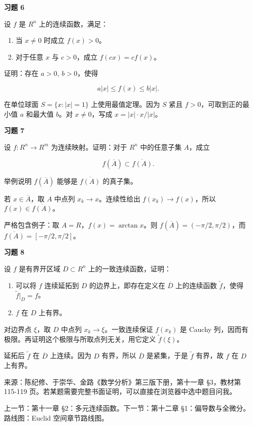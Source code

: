\begin{exercisebox}
\textbf{习题 6}

设 \(f\) 是 \(R^n\) 上的连续函数，满足：

\begin{enumerate}
 \item 当 \(x\ne0\) 时成立 \(f(x)>0\)。
 \item 对于任意 \(x\) 与 \(c>0\)，成立 \(f(cx)=cf(x)\)。
 \end{enumerate}

证明：存在 \(a>0,\ b>0\)，使得

\[
        a|x|\le f(x)\le b|x|.
      \]

\begin{hintbox}
在单位球面 \(S=\{x:|x|=1\}\) 上使用最值定理。因为 \(S\) 紧且 \(f>0\)，可取到正的最小值 \(a\) 和最大值 \(b\)。对 \(x\ne0\)，写成 \(x=|x|\cdot x/|x|\)。
\end{hintbox}
\end{exercisebox}

\begin{exercisebox}
\textbf{习题 7}

设 \(f:R^n\to R^m\) 为连续映射。证明：对于 \(R^n\) 中的任意子集 \(A\)，成立

\[
        f(\overline A)\subset \overline{f(A)}.
      \]

举例说明 \(f(\overline A)\) 能够是 \(\overline{f(A)}\) 的真子集。

\begin{hintbox}
若 \(x\in\overline A\)，取 \(A\) 中点列 \(x_k\to x\)。连续性给出 \(f(x_k)\to f(x)\)，所以 \(f(x)\in\overline{f(A)}\)。

严格包含例子：取 \(A=R\)，\(f(x)=\arctan x\)。则 \(f(\overline A)=(-\pi/2,\pi/2)\)，而 \(\overline{f(A)}=[-\pi/2,\pi/2]\)。
\end{hintbox}
\end{exercisebox}

\begin{exercisebox}
\textbf{习题 8}

设 \(f\) 是有界开区域 \(D\subset R^n\) 上的一致连续函数，证明：

\begin{enumerate}
 \item 可以将 \(f\) 连续延拓到 \(D\) 的边界上，即存在定义在 \(\overline D\) 上的连续函数 \(\widetilde f\)，使得 \(\widetilde f|_D=f\)。
 \item \(f\) 在 \(D\) 上有界。
 \end{enumerate}

\begin{hintbox}
对边界点 \(\xi\)，取 \(D\) 中点列 \(x_k\to\xi\)。一致连续保证 \(f(x_k)\) 是 Cauchy 列，因而有极限。再证明这个极限与所取点列无关，用它定义 \(\widetilde f(\xi)\)。

延拓后 \(\widetilde f\) 在 \(\overline D\) 上连续。因为 \(D\) 有界，所以 \(\overline D\) 是紧集，于是 \(\widetilde f\) 有界，故 \(f\) 在 \(D\) 上有界。
\end{hintbox}
\end{exercisebox}

来源：陈纪修、于崇华、金路《数学分析》第三版下册，第十一章 §3，教材第 115-119 页。若某题需要完整书面证明，可以直接在浏览器中选中题目问我。

上一节：第十一章 §2：多元连续函数。下一节：第十二章 §1：偏导数与全微分。路线图：Euclid 空间章节路线图。
